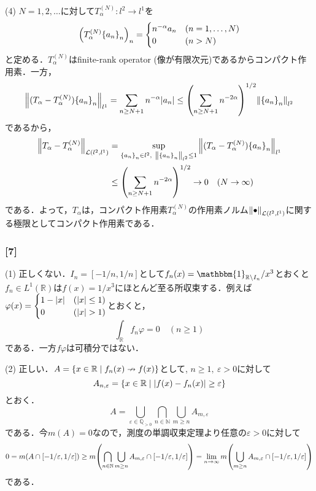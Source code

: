\documentclass[a4j]{ltjsarticle}
\newcommand{\Rset}{\mathbb{R}}
\newcommand{\Nset}{\mathbb{N}}
\newcommand{\Qset}{\mathbb{Q}}
\newcommand{\1}{\mathbbm{1}}
\numberwithin{equation}{section}
\theoremstyle{definition}
\begin{document}
(4) $N=1,2,\ldots$に対して$T^{(N)}_{\alpha}\colon l^2\to l^1$を
\begin{equation}
    \qty(T^{(N)}_{\alpha}\qty{a_n}_n)_n=\begin{cases}
        n^{-\alpha}a_n & (n=1,\ldots,N) \\
        0 & (n>N)
    \end{cases}
\end{equation}
と定める．$T^{(N)}_{\alpha}$はfinite-rank operator (像が有限次元)であるからコンパクト作用素．一方，
\begin{equation}
    \norm{(T_{\alpha}-T^{(N)}_{\alpha})\qty{a_n}_n}_{l^1}=\sum_{n\geq N+1}n^{-\alpha}\abs{a_n}\leq \qty(\sum_{n\geq N+1}n^{-2\alpha})^{1/2}\norm{\qty{a_n}_{n}}_{l^2}
\end{equation}
であるから，
\begin{align}
    \norm{T_{\alpha}-T^{(N)}_{\alpha}}_{\mathcal{L}(l^2,l^1)}
    &=\sup_{\qty{a_n}_n\in l^2,\ \norm{\qty{a_n}_{n}}_{l^2}
    \leq 1}\norm{(T_{\alpha}-T^{(N)}_{\alpha})\qty{a_n}_n}_{l^1}\\
    &\leq \qty(\sum_{n\geq N+1}n^{-2\alpha})^{1/2}\to0\quad (N\to\infty)
\end{align}
である．よって，$T_\alpha$は，コンパクト作用素$T_{\alpha}^{(N)}$の作用素ノルム$\norm{\bullet}_{\mathcal{L}(l^2,l^1)}$に関する極限としてコンパクト作用素である．
\subsubsection*{[7]}
(1) 正しくない．$I_n=[-1/n,1/n]$として$f_n(x)=\1_{\Rset\setminus I_n}/x^3$とおくと$f_n\in L^1(\Rset)$は$f(x)=1/x^3$にほとんど至る所収束する．例えば$\varphi(x)=\begin{cases}
    1-\abs{x} & (\abs{x}\leq 1) \\
    0 & (\abs{x}>1)
\end{cases}$とおくと，
\begin{equation}
    \int_{\Rset}f_n\varphi=0\quad (n\geq 1)
\end{equation}
である．一方$f\varphi$は可積分ではない．

(2) 正しい．$A=\qty{x\in\Rset\mid f_n(x)\nrightarrow f(x)}$として,
$n\geq1,\ \varepsilon>0$に対して
\begin{equation}
    A_{n,\varepsilon}=\qty{x\in\Rset\mid \abs{f(x)-f_n(x)}\geq \varepsilon}
\end{equation}
とおく．
\begin{equation}
    A=\bigcup_{\varepsilon\in \Qset_{>0}}\bigcap_{n\in\Nset}\bigcup_{m\geq n}A_{m,\varepsilon}
\end{equation}
である．今$m(A)=0$なので，測度の単調収束定理より任意の$\varepsilon>0$に対して
\begin{equation}
    0=m(A\cap[-1/\varepsilon,1/\varepsilon])\geq m\qty(\bigcap_{n\in\Nset}\bigcup_{m\geq n}A_{m,\varepsilon}\cap[-1/\varepsilon,1/\varepsilon])=\lim_{n\to\infty}m\qty(\bigcup_{m\geq n}A_{m,\varepsilon}\cap[-1/\varepsilon,1/\varepsilon])
\end{equation}
である．
\end{document}

